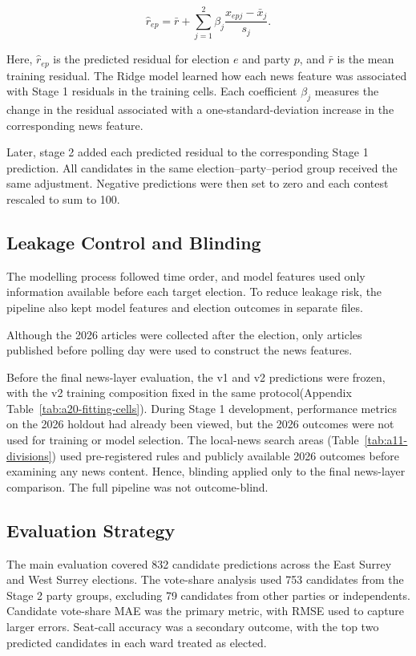 \documentclass[final-report]{report-template}
\begin{document}
\[
\widehat{r}_{ep}
=
\bar{r}
+
\sum_{j=1}^{2}
\beta_j
\frac{x_{epj}-\bar{x}_j}{s_j}.
\]

Here, $\widehat{r}_{ep}$ is the predicted residual for election $e$ and party $p$, and $\bar{r}$ is the mean training residual. The Ridge model learned how each news feature was associated with Stage 1 residuals in the training cells. Each coefficient $\beta_j$ measures the change in the residual associated with a one-standard-deviation increase in the corresponding news feature. 

Later, stage 2 added each predicted residual to the corresponding Stage 1 prediction. All candidates in the same election--party--period group received the same adjustment. Negative predictions were then set to zero and each contest rescaled to sum to 100.

\subsection{Leakage Control and Blinding}
\label{sec:leakage-control}
The modelling process followed time order, and model features used only information available before each target election. To reduce leakage risk, the pipeline also kept model features and election outcomes in separate files.

Although the 2026 articles were collected after the election, only articles published before polling day were used to construct the news features. 

Before the final news-layer evaluation, the v1 and v2 predictions were frozen, with the v2 training composition fixed in the same protocol(Appendix Table~\ref{tab:a20-fitting-cells}). During Stage 1 development, performance metrics on the 2026 holdout had already been viewed, but the 2026 outcomes were not used for training or model selection. The local-news search areas (Table~\ref{tab:a11-divisions}) used pre-registered rules and publicly available 2026 outcomes before examining any news content. Hence, blinding applied only to the final news-layer comparison. The full pipeline was not outcome-blind.

\subsection{Evaluation Strategy}
The main evaluation covered 832 candidate predictions across the East Surrey and West Surrey elections. The vote-share analysis used 753 candidates from the Stage 2 party groups, excluding 79 candidates from other parties or independents. Candidate vote-share MAE was the primary metric, with RMSE used to capture larger errors. Seat-call accuracy was a secondary outcome, with the top two predicted candidates in each ward treated as elected.
\end{document}
